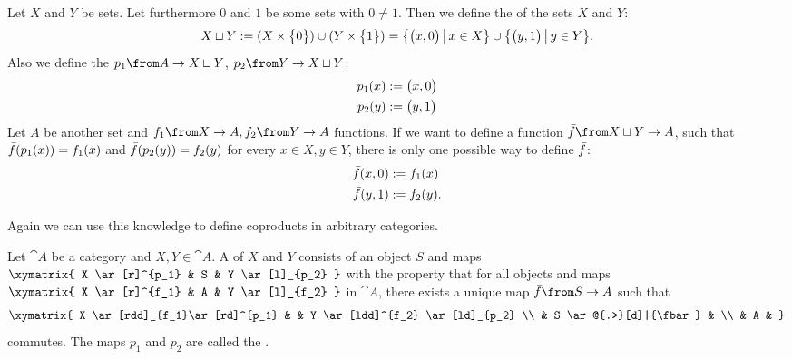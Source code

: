 \begin{example}
  \label{ex:coprod:dunion}
  Let $X$ and $Y$ be sets.
  Let furthermore $0$ and $1$ be some sets with $0 \ne 1$.
  Then we define the  of the sets $X$ and $Y$:
  $$X \sqcup Y := (X \times \bigl \{ 0 \bigr \}) \cup (Y \times \bigl \{ 1 \bigr \}) = \bigl \{ \bigl( x , 0 \bigr) \,\big|\, x \in X \bigr \} \cup \bigl \{ \bigl( y , 1 \bigr) \,\big|\, y \in Y \bigr \}.$$
  Also we define the  $p_1 \from A \to X \dunion Y$, $p_2 \from Y \to X \dunion Y$:
  \begin{alignat*}{2}
    p_1(x) &:= \bigl( x , 0 \bigr) \\
    p_2(y) &:= \bigl( y , 1 \bigr)
  \end{alignat*}
  Let $A$ be another set and $f_1 \from X \to A, f_2 \from Y \to A$ functions.
  If we want to define a function $\fbar \from X \dunion Y \to A$, such that
  $\bar{f}(p_1(x)) = f_1(x)$ and $\bar{f}(p_2(y)) = f_2(y)$ for every $x \in X, y \in Y$,
  there is only one possible way to define $\bar{f}$:
  \begin{alignat*}{2}
    \bar{f}(x, 0) &:= f_1(x) \\
    \bar{f}(y, 1) &:= f_2(y).
  \end{alignat*}
\end{example}

Again we can use this knowledge to define coproducts in arbitrary categories.

\begin{definition}[Coproduct]
  \label{def:coproduct}
  Let $\cat{A}$ be a category and $X, Y \in \cat{A}$.
  A  of $X$ and $Y$ consists of an object $S$ and maps
  $ \xymatrix{
    X \ar[r]^{p_1} & S & Y \ar[l]_{p_2}
  } $
  with the property that for all objects and maps
  $ \xymatrix{
    X \ar[r]^{f_1} & A & Y \ar[l]_{f_2}
  } $
  in $\cat{A}$, there exists a unique map $\fbar\from S \to A$ such that
  \[ \xymatrix{
    X \ar[rdd]_{f_1}\ar[rd]^{p_1} & & Y \ar[ldd]^{f_2} \ar[ld]_{p_2} \\
    & S \ar@{.>}[d]|{\fbar} & \\
    & A &
  } \]
  commutes. The maps $p_1$ and $p_2$ are called the .
\end{definition}

